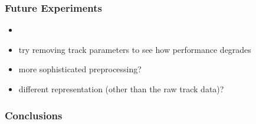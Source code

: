 \documentclass{beamer}
\begin{document}
\begin{frame}
  \frametitle{Future Experiments}

  \begin{itemize}
    \item 
    \item try removing track parameters to see how performance degrades
    \item more sophisticated preprocessing?
    \item different representation (other than the raw track data)?
  \end{itemize}
\end{frame}

\begin{frame}
  \frametitle{Conclusions}
\end{frame}
 
\end{document}
